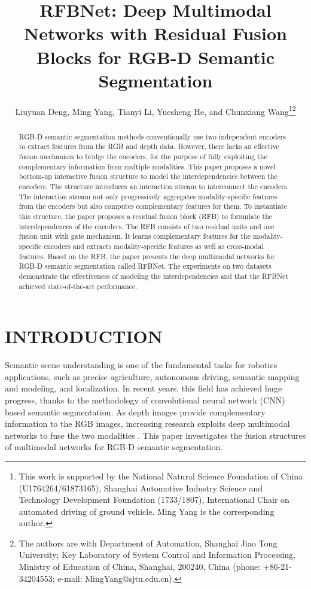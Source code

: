 \documentclass[letterpaper, 10 pt, conference]{ieeeconf}
\title{\LARGE \bf
	RFBNet: Deep Multimodal Networks with Residual Fusion Blocks for RGB-D Semantic Segmentation
}
\author{Liuyuan Deng, Ming Yang, Tianyi Li, Yuesheng He, and Chunxiang Wang\thanks{This work is supported by the National Natural Science Foundation of China (U1764264/61873165), Shanghai Automotive Industry Science and Technology Development Foundation (1733/1807), International Chair on automated driving of ground vehicle. Ming Yang is the corresponding author.}\thanks{The authors are with Department of Automation, Shanghai Jiao Tong University; Key Laboratory of System Control and Information Processing, Ministry of Education of China, Shanghai, 200240, China (phone: +86-21-34204553; e-mail: MingYang@sjtu.edu.cn).}}
\begin{document}
	
	
	
	\maketitle
	\thispagestyle{empty}
	\pagestyle{empty}
	
\begin{abstract}
		RGB-D semantic segmentation methods conventionally use two independent encoders to extract features from the RGB and depth data. However, there lacks an effective fusion mechanism to bridge the encoders, for the purpose of fully exploiting the complementary information from multiple modalities. This paper proposes a novel bottom-up interactive fusion structure to model the interdependencies between the encoders. The structure introduces an interaction stream to interconnect the encoders. The interaction stream not only progressively aggregates modality-specific features from the encoders but also computes complementary features for them. To instantiate this structure, the paper proposes a residual fusion block (RFB) to formulate the interdependences of the encoders. The RFB consists of two residual units and one fusion unit with gate mechanism. It learns complementary features for the modality-specific encoders and extracts modality-specific features as well as cross-modal features. Based on the RFB, the paper presents the deep multimodal networks for RGB-D semantic segmentation called RFBNet. The experiments on two datasets demonstrate the effectiveness of modeling the interdependencies and that the RFBNet achieved state-of-the-art performance.
	\end{abstract}
	
	

	\section{INTRODUCTION}
	
	Semantic scene understanding is one of the fundamental tasks for robotics applications, such as precise agriculture\cite{milioto2018real}, autonomous driving\cite{neven2017fast}, semantic mapping and modeling\cite{hermans2014dense,chen20193d}, and localization\cite{stenborg2018long,deng2019semantic}. In recent years, this field has achieved huge progress, thanks to the methodology of convolutional neural network (CNN) based semantic segmentation\cite{shelhamer2017fully,chen2018encoder,zhao2016pyramid}. As depth images provide complementary information to the RGB images, increasing research exploits deep multimodal networks to fuse the two modalities \cite{couprie2013indoor,hazirbas2016fusenet,valada2019self}. This paper investigates the fusion structures of multimodal networks for RGB-D semantic segmentation.
	
\end{document}
